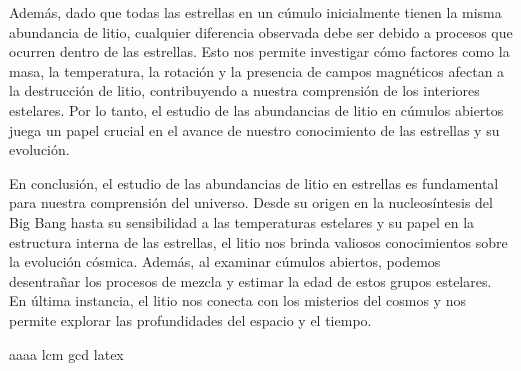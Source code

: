 Además, dado que todas las estrellas en un cúmulo inicialmente tienen la misma abundancia de litio, cualquier diferencia observada debe ser debido a procesos que ocurren dentro de las estrellas. Esto nos permite investigar cómo factores como la masa, la temperatura, la rotación y la presencia de campos magnéticos afectan a la destrucción de litio, contribuyendo a nuestra comprensión de los interiores estelares. Por lo tanto, el estudio de las abundancias de litio en cúmulos abiertos juega un papel crucial en el avance de nuestro conocimiento de las estrellas y su evolución.\par

En conclusión, el estudio de las abundancias de litio en estrellas es fundamental para nuestra comprensión del universo. Desde su origen en la nucleosíntesis del Big Bang hasta su sensibilidad a las temperaturas estelares y su papel en la estructura interna de las estrellas, el litio nos brinda valiosos conocimientos sobre la evolución cósmica. Además, al examinar cúmulos abiertos, podemos desentrañar los procesos de mezcla y estimar la edad de estos grupos estelares. En última instancia, el litio nos conecta con los misterios del cosmos y nos permite explorar las profundidades del espacio y el tiempo.\par

aaaa \gls{lcm} \acrshort{gcd} \Gls{latex}


\endinput

